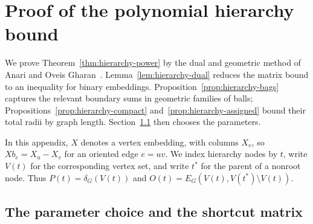 \section{Proof of the polynomial hierarchy bound}
\label{app:hierarchy-proof}

We prove Theorem~\ref{thm:hierarchy-power} by the dual and geometric
method of Anari and Oveis Gharan~\cite{AOG}.
Lemma~\ref{lem:hierarchy-dual} reduces the matrix bound to an inequality
for binary embeddings. Proposition~\ref{prop:hierarchy-bags} captures
the relevant boundary sums in geometric families of balls;
Propositions~\ref{prop:hierarchy-compact} and~\ref{prop:hierarchy-assigned}
bound their total radii by graph length.
Section~\ref{hp:endpoint} then chooses the parameters.

In this appendix, $X$ denotes a vertex embedding, with columns $X_v$,
so $Xb_e=X_u-X_v$ for an oriented edge $e=uv$.
We index hierarchy nodes by $t$, write $V(t)$ for the corresponding
vertex set, and write $t^*$ for the parent of a nonroot node.
Thus $P(t)=\delta_G(V(t))$ and
$O(t)=E_G(V(t),V(t^*)\setminus V(t))$.






\subsection{The parameter choice and the shortcut matrix}
\label{hp:endpoint}

